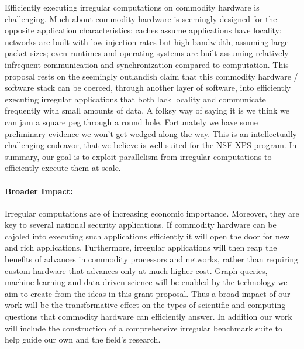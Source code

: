 Efficiently executing irregular computations on commodity hardware is challenging.  Much about commodity hardware is seemingly designed for the opposite application characteristics: caches assume applications have locality; networks are built with low injection rates but high bandwidth, assuming large packet sizes; even runtimes and operating systems are built assuming relatively infrequent communication and synchronization compared to computation.  This proposal rests on the seemingly outlandish claim that this commodity hardware / software stack can be coerced, through another layer of software, into efficiently executing irregular applications that both lack locality and communicate frequently with small amounts of data.  A folksy way of saying it is we think we can jam a square peg through a round hole.  Fortunately we have some preliminary evidence we won't get wedged along the way.  This is an intellectually challenging endeavor, that we believe is well suited for the NSF XPS program.  In summary, our goal is to exploit parallelism from irregular computations to efficiently execute them at scale.

\paragraph{Broader Impact:}

Irregular computations are of increasing economic importance.  Moreover, they are key to several national security applications.  If commodity hardware can be cajoled into executing such applications efficiently it will open the door for new and rich applications.  Furthermore, irregular applications will then reap the benefits of advances in commodity processors and networks, rather than requiring custom hardware that advances only at much higher cost.  Graph queries, machine-learning and data-driven science will be enabled by the technology we aim to create from the ideas in this grant proposal.  Thus a broad impact of our work will be the transformative effect on the types of scientific and computing questions that commodity hardware can efficiently answer. In addition our work will include the construction of a comprehensive irregular benchmark suite to help guide our own and the field's research.
